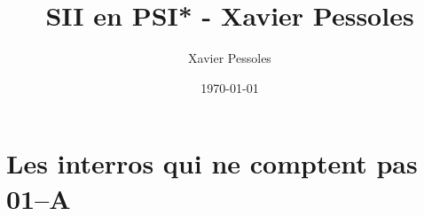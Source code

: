 \documentclass[
	fontsize=10pt, %
	twoside=true, %
]{kaobook}
\newcommand{\repRel}{../../../..}
\newcommand{\repStyle}{\repRel/Style}
\begin{document}

\titlehead{Document Template}
\title[SII en PSI* - Xavier Pessoles]{SII en PSI* - Xavier Pessoles}
\author[XP]{Xavier Pessoles}
\date{\today}

%
\frontmatter %


%
\mainmatter %


\setcounter{margintocdepth}{\sectiontocdepth}
\marginlayout
\graphicspath{{\repStyle/png}}

\pagestyle{xp.scrheadings}



\newcommand{\repExo}{}
\newcommand{\nomExo}{}

\livrettrue %
\collefalse\colletrue
\normaltrue

\newcommand{\exer}{\subsection*}

\proftrue

\renewcommand{\repExo}{\repRel/PSI_Cy_03_ConceptionCommande/Chapitre_01_Correction//}
\renewcommand{\nomExo}{Cy_03_01_TD_PI_03_SysReeduc}

\graphicspath{{\repRel/Style/png/}{\repExo/\nomExo/images/}}

\chapter*{Les interros qui ne comptent pas 01--A}
\end{document}
